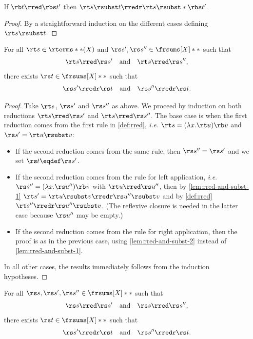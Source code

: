 \begin{lemma} \label{lem:rred-and-subst-2}
	If $\rb t \rred \rbs t'$ then 
	$\rt s \rsubst t \rredr \rt s \rsubst* {\rbs t'}$.
\end{lemma}
	
	\begin{proof}
	By a straightforward induction on the different cases
	defining $\rt s \rsubst t$.
	\end{proof}

\begin{lemma} \label{lem:rred-confl-one-term}
	For all $\rt s \in \rterms**(X)$ and 
	$\rs s', \rs s'' \in \frsums[X]**$ such that 
	\[ \rt s \rred \rs s' \quad \text{and} \quad \rt s \rred \rs s'', \]
	there exists $\rs t \in \frsums[X]**$ such that
	\[ \rs s' \rredr \rs t \quad \text{and} \quad \rs s'' \rredr \rs t. \]
\end{lemma}
	
	\begin{proof}
	Take $\rt s$, $\rs s'$ and $\rs s''$ as above.
	We proceed by induction on both reductions
	$\rt s \rred \rs s'$ and $\rt s \rred \rs s''$.
	The base case is when the first reduction
	comes from the first rule in \cref{def:rred},
	\emph{i.e.} $\rt s = (\ensuremath{\lambda}x.\rt u)\rb v$
	and $\rs s' = \rt u \rsubst v$:
	\begin{itemize}
	\item If the second reduction comes from the same rule,
		then $\rs s'' = \rs s'$ and we set $\rs t \eqdef \rs s'$.
	\item If the second reduction comes from the rule for left application,
		\emph{i.e.} $\rs s'' = (\ensuremath{\lambda}x.\rs u'')\rb v$
		with $\rt u \rred \rs u''$, then
		by \cref{lem:rred-and-subst-1}
		$\rt s' = \rt u \rsubst v \rredr \rs u'' \rsubst v$
		and by \cref{def:rred} $\rt s'' \rredr \rs u'' \rsubst v$.
		(The reflexive closure is needed in the latter case
		because $\rs u''$ may be empty.)
	\item If the second reduction comes from the rule for right application,
		then the proof is as in the previous case,
		using \cref{lem:rred-and-subst-2}
		instead of \cref{lem:rred-and-subst-1}.
	\end{itemize}
	In all other cases, the results immediately follows from
	the induction hypotheses.
	\end{proof}

\begin{theorem}
	For all $\rs s, \rs s', \rs s'' \in \frsums[X]**$ 	such that 
	\[ \rs s \rred \rs s' \quad \text{and} \quad \rs s \rred \rs s'', \]
	there exists $\rs t \in \frsums[X]**$ such that
	\[ \rs s' \rredr \rs t \quad \text{and} \quad \rs s'' \rredr \rs t. \]
\end{theorem}

